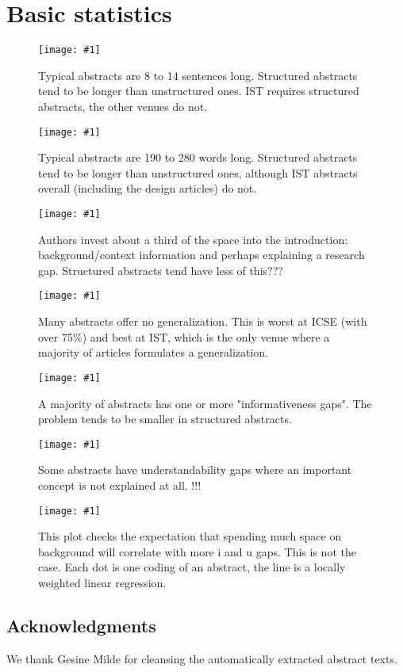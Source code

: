 \documentclass[10pt,journal,compsoc]{IEEEtran}
\newcommand{\Plot}[2]{%
	\begin{figure}[!t]%
		\centering\texttt{[image: \#1]}%
		\vspace{-6mm}\caption{#2}\label{#1}%
	\end{figure}}
\begin{document}
\appendix
\section{Basic statistics}

\Plot{boxplots_sentences}{%
  Typical abstracts are 8 to 14 sentences long.
  Structured abstracts tend to be longer than unstructured ones.
  IST requires structured abstracts, the other venues do not.}
\Plot{boxplots_words}{%
  Typical abstracts are 190 to 280 words long. 
  Structured abstracts tend to be longer than unstructured ones, 
  although IST abstracts overall (including the design articles) do not.}
\Plot{boxplots_fraction_introduction}{%
  Authors invest about a third of the space into the introduction:
  background/context information and perhaps explaining a research gap.
  Structured abstracts tend have less of this???}
\Plot{boxplots_fraction_conclusion}{%
  Many abstracts offer no generalization.
  This is worst at ICSE (with over 75\%)
  and best at IST, which is the only venue where a majority of articles formulates a generalization.}
\Plot{boxplots_icount}{%
  A majority of abstracts has one or more "informativeness gaps".
  The problem tends to be smaller in structured abstracts.}
\Plot{boxplots_ucount}{%
  Some abstracts have understandability gaps where an important concept is not explained at all.
  !!!}
\Plot{lowess_gaps_by_fracintro}{%
  This plot checks the expectation that spending much space on background
  will correlate with more i and u gaps.
  This is not the case.
  Each dot is one coding of an abstract, 
  the line is a locally weighted linear regression.}



\subsection{Acknowledgments}
\noindent We thank Gesine Milde for cleansing the automatically extracted abstract texts.




\end{document}
